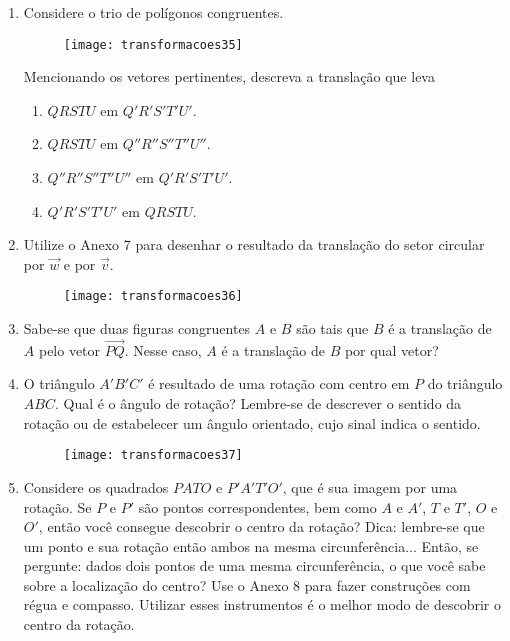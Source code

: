 \exercise


\begin{enumerate}
\item Considere o trio de polígonos congruentes. 

\begin{figure}[H]
\centering

\texttt{[image: transformacoes35]}
\end{figure}

Mencionando os vetores pertinentes, descreva a translação que leva
\begin{enumerate}
\item $QRSTU$ em $Q'R'S'T'U'$. 
\item $QRSTU$ em $Q''R''S''T''U''$.
\item $Q''R''S''T''U''$ em $Q'R'S'T'U'$.
\item $Q'R'S'T'U'$ em $QRSTU$.

\end{enumerate}

\item Utilize o Anexo 7 para desenhar o resultado da translação do setor circular por $\overrightarrow{w}$ e por $\overrightarrow{v}$.

\begin{figure}[H]
\centering

\texttt{[image: transformacoes36]}
\end{figure}

\item Sabe-se que duas figuras congruentes $A$ e $B$ são tais que $B$ é a translação de $A$ pelo vetor $\overrightarrow{PQ}$. Nesse caso, $A$ é a translação de $B$ por qual vetor?

\item O triângulo $A'B'C'$ é resultado de uma rotação com centro em $P$ do triângulo $ABC$. Qual é o ângulo de rotação? Lembre-se de descrever o sentido da rotação ou de estabelecer um ângulo orientado, cujo sinal indica o sentido.

\begin{figure}[H]
\centering

\texttt{[image: transformacoes37]}
\end{figure}

\item Considere os quadrados $PATO$ e $P'A'T'O'$, que é sua imagem por uma rotação. Se $P$ e $P'$ são pontos correspondentes, bem como $A$ e $A'$, $T$ e $T'$, $O$ e $O'$, então você consegue descobrir o centro da rotação? Dica: lembre-se que um ponto e sua rotação então ambos na mesma circunferência... Então, se pergunte: dados dois pontos de uma mesma circunferência, o que você sabe sobre a localização do centro? Use o Anexo 8 para fazer construções com régua e compasso. Utilizar esses instrumentos é o melhor modo de descobrir o centro da rotação.


\end{enumerate}
